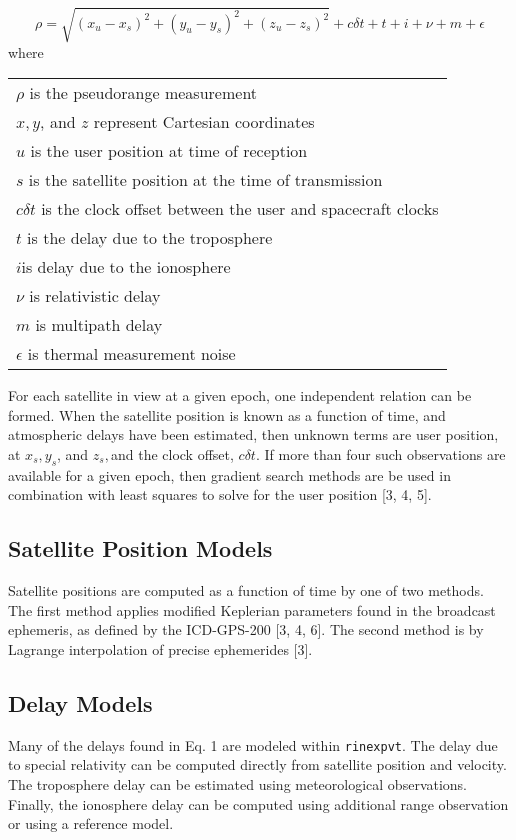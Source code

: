 \begin{equation}
  \rho = \sqrt{( x_u - x_s )^2 + ( y_u - y_s )^2 + ( z_u - z_s^{^{}})^2} + c \delta t + t + i + \nu + m + \epsilon
\end{equation}
where \begin{tabular}{l}
  $\rho$ is the pseudorange measurement\\
  $x, y$, and $z$ represent Cartesian coordinates\\
  $u$ is the user position at time of reception\\
  $s$ is the satellite position at the time of transmission\\
  $c \delta t$ is the clock offset between the user and spacecraft clocks\\
  $t$ is the delay due to the troposphere\\
  $i$is delay due to the ionosphere\\
  $\nu$ is relativistic delay\\
  $m$ is multipath delay\\
  $\epsilon$ is thermal measurement noise
\end{tabular}

For each satellite in view at a given epoch, one independent
relation can be formed. When the satellite position is known as a function of
time, and atmospheric delays have been estimated, then unknown terms are user
position, at $x_s, y_s$, and $z_s,$and the clock offset, $c \delta t$. If more
than four such observations are available for a given epoch, then gradient
search methods are be used in combination with least squares to solve for the
user position [3, 4, 5].

\subsection{Satellite Position Models}

Satellite positions are computed as a function of time by one of two methods.
The first method applies modified Keplerian parameters found in the broadcast
ephemeris, as defined by the ICD-GPS-200 [3, 4, 6]. The second method is by
Lagrange interpolation of precise ephemerides [3].

\subsection{Delay Models}

Many of the delays found in Eq. 1 are modeled within \texttt{rinexpvt}. The
delay due to special relativity can be computed directly from satellite
position and velocity. The troposphere delay can be estimated using
meteorological observations. Finally, the ionosphere delay can be computed
using additional range observation or using a reference model.

